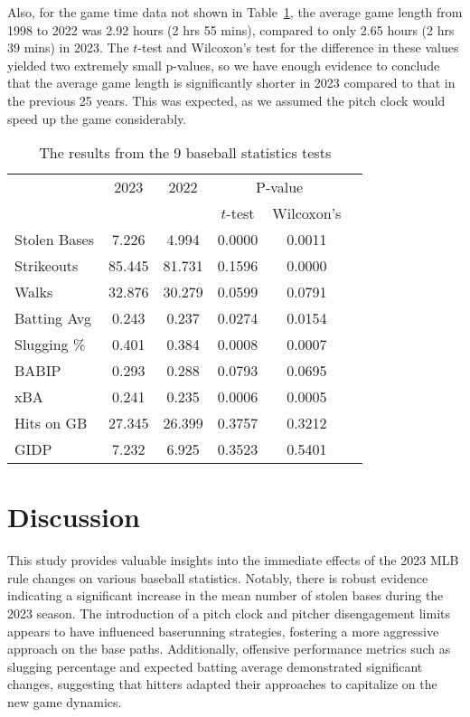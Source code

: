 \documentclass[12pt]{article}
\begin{document}
Also, for the game time data not shown in Table~\ref{tab:table1}, the average game
length from 1998 to 2022 was 2.92 hours (2 hrs 55 mins), compared to only 2.65 hours
(2 hrs 39 mins) in 2023. The \(t\)-test and Wilcoxon's test for the difference in
these values yielded two extremely small p-values, so we have enough evidence to 
conclude that the average game length is significantly shorter in 2023 compared to
that in the previous 25 years. This was expected, as we assumed the pitch clock would
speed up the game considerably.

\begin{table}[tbp]
  \caption{The results from the 9 baseball statistics tests}
  \label{tab:table1}
  \centering
  \begin{tabular}[t]{lccccc}
    \toprule
    & 2023 & 2022 & \multicolumn{2}{c}{P-value}\\
    \cmidrule(lr){4-5}
    &          &                & \(t\)-test & Wilcoxon's\\
    \midrule
    Stolen Bases & 7.226 & 4.994 & 0.0000 & 0.0011 \\ 
    Strikeouts & 85.445 & 81.731 & 0.1596 & 0.0000 \\ 
    Walks & 32.876 & 30.279 & 0.0599 & 0.0791 \\ 
    Batting Avg & 0.243 & 0.237 & 0.0274 & 0.0154 \\ 
    Slugging \% & 0.401 & 0.384 & 0.0008 & 0.0007 \\ 
    BABIP & 0.293 & 0.288 & 0.0793 & 0.0695 \\ 
    xBA & 0.241 & 0.235 & 0.0006 & 0.0005 \\ 
    Hits on GB & 27.345 & 26.399 & 0.3757 & 0.3212 \\ 
    GIDP & 7.232 & 6.925 & 0.3523 & 0.5401 \\ 
    \bottomrule
  \end{tabular}
\end{table}


\section{Discussion}
\label{sec:disc}

This study provides valuable insights into the immediate effects of the 2023 MLB
rule changes on various baseball statistics. Notably, there is robust evidence
indicating a significant increase in the mean number of stolen bases during the
2023 season. The introduction of a pitch clock and pitcher disengagement limits
appears to have influenced baserunning strategies, fostering a more aggressive
approach on the base paths. Additionally, offensive performance metrics such as
slugging percentage and expected batting average demonstrated significant changes,
suggesting that hitters adapted their approaches to capitalize on the new game dynamics.
\end{document}
